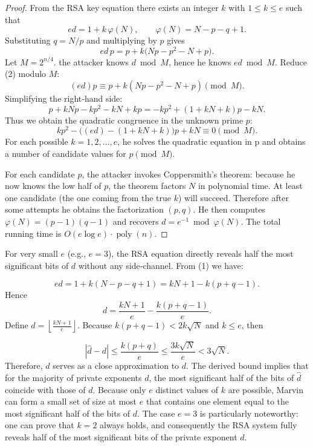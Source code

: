 \begin{proof}
From the RSA key equation there exists an integer \(k\) with \(1\le k\le e\) such that
\[
ed = 1 + k\,\varphi(N),\qquad \varphi(N)=N-p-q+1. \tag{1}
\]
Substituting \(q=N/p\) and multiplying by \(p\) gives
\[
ed\,p = p + k\bigl(Np-p^2-N+p\bigr). 
\]
Let \(M = 2^{n/4}\). the attacker knows \(d\bmod M\), hence he knows \(ed\bmod M\). Reduce (2) modulo \(M\):
\[
(ed)p \equiv p + k(Np-p^2-N+p) \pmod{M}.
\]
Simplifying the right‑hand side:
\[
p + kNp - kp^2 - kN + kp = -kp^2 + (1+kN+k)p - kN.
\]
Thus we obtain the quadratic congruence in the unknown prime \(p\):
\[
kp^2 - \bigl((ed)-(1+kN+k)\bigr)p + kN \equiv 0 \pmod{M}. 
\]
For each possible \(k=1,2,\dots,e\), he solves
the quadratic equation in p and obtains a number of candidate values for \(p \pmod M\).

For each candidate \(p\), the attacker invokes Coppersmith's theorem: because he now knows the low half of \(p\), the theorem factors \(N\) in polynomial time. At least one candidate (the one coming from the true \(k\)) will succeed. Therefore after some attempts he obtains the factorization \((p,q)\). He then computes \(\varphi(N)=(p-1)(q-1)\) and recovers \(d = e^{-1}\bmod\varphi(N)\). The total running time is \(O(e\log e)\cdot\operatorname{poly}(n)\).
\end{proof}


For very small \(e\) (e.g., \(e=3\)), the RSA equation directly reveals half the most significant bits of \(d\) without any side‑channel. From (1) we have:

\[
ed = 1 + k(N-p-q+1) = kN + 1 - k(p+q-1).
\]
Hence
\[
d = \frac{kN+1}{e} - \frac{k(p+q-1)}{e}.
\]
Define \(\hat{d} = \left\lfloor \frac{kN+1}{e} \right\rfloor\). Because \(k(p+q-1) < 2k\sqrt{N}\) and \(k\le e\), then 

\[
|\hat{d} - d| \le \frac{k(p+q)}{e} \le \frac{3k\sqrt{N}}{e} < 3\sqrt{N}.
\]
Therefore, \(\hat{d}\) serves as a close approximation to \(d\). The derived bound implies that for the majority of private exponents \(d\), the most significant half of the bits of \(\hat{d}\) coincide with those of \(d\). Because only \(e\) distinct values of \(k\) are possible, Marvin can form a small set of size at most \(e\) that contains one element equal to the most significant half of the bits of \(d\). The case \(e = 3\) is particularly noteworthy: one can prove that \(k = 2\) always holds, and consequently the RSA system fully reveals half of the most significant bits of the private exponent \(d\).

